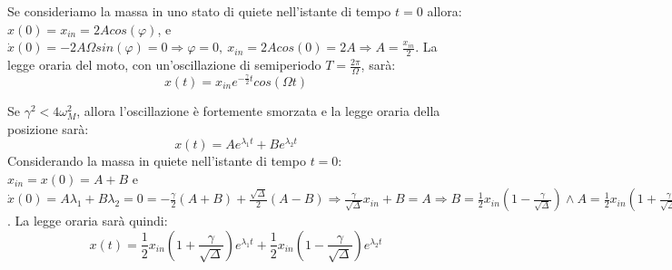 \documentclass{article}
\numberwithin{equation}{subsection}
\begin{document}
Se consideriamo la massa in uno stato di quiete nell'istante 
di tempo $t=0$ allora:
$x(0)=x_{in}=2Acos(\varphi)$, e $\dot x(0)=-2A\Omega sin(\varphi)=0\Rightarrow\varphi=0,\:x_{in}=2Acos(0)=2A\Rightarrow A=\displaystyle\frac{x_{in}}{2}$. 
La legge oraria del moto, con un'oscillazione di 
semiperiodo $T=\displaystyle\frac{2\pi}{\Omega}$, sarà: 
\begin{equation}
    x(t)=x_{in}e^{-\displaystyle\frac{\gamma}{2}t}cos(\Omega t)
\end{equation}

\begin{center}\end{center}

Se $\gamma^{2}<4\omega_M^{2}$, allora l'oscillazione è fortemente 
smorzata e la legge oraria della posizione sarà:
\begin{equation}
    x(t)=Ae^{\lambda_1t}+Be^{\lambda_2t}
\end{equation}
Considerando la massa in quiete nell'istante di tempo $t=0$: 
$x_{in}=x(0)=A+B$ e $\dot x(0)=A\lambda_1+B\lambda_2=0=-\displaystyle\frac{\gamma}{2}(A+B)+\frac{\sqrt{\Delta}}{2}(A-B)\Rightarrow\displaystyle\frac{\gamma}{\sqrt{\Delta}}x_{in}+B=A\Rightarrow B=\displaystyle\frac{1}{2}x_{in}\left(1-\displaystyle\frac{\gamma}{\sqrt{\Delta}}\right)\land A=\displaystyle\frac{1}{2}x_{in}\left(1+\displaystyle\frac{\gamma}{\sqrt{\Delta}}\right)$. 
La legge oraria sarà quindi:
\begin{equation}
    x(t)=\displaystyle\frac{1}{2}x_{in}\left(1+\displaystyle\frac{\gamma}{\sqrt{\Delta}}\right)e^{\lambda_1t}+\displaystyle\frac{1}{2}x_{in}\left(1-\displaystyle\frac{\gamma}{\sqrt{\Delta}}\right)e^{\lambda_2t}
\end{equation}
\end{document}
